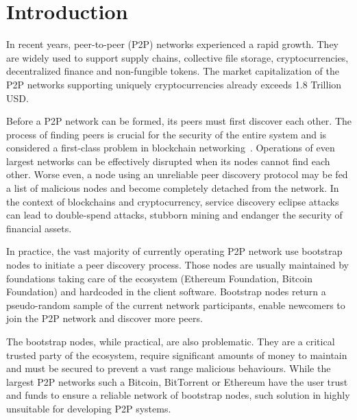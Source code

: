 
\section{Introduction}
In recent years, peer-to-peer (P2P) networks experienced a rapid growth. They are widely used to support supply chains, collective file storage, cryptocurrencies, decentralized finance and non-fungible tokens. The market capitalization of the P2P networks supporting uniquely cryptocurrencies already exceeds 1.8 Trillion USD. 



Before a P2P network can be formed, its peers must first discover each other. The process of finding peers is crucial for the security of the entire system and is considered a first-class problem in blockchain networking~\cite{dotan2021survey}. Operations of even largest networks can be effectively disrupted when its nodes cannot find each other. Worse even, a node using an unreliable peer discovery protocol may be fed a list of malicious nodes and become completely detached from the network. In the context of blockchains and cryptocurrency, service discovery eclipse attacks can lead to double-spend attacks, stubborn mining and endanger the security of financial assets.

In practice, the vast majority of currently operating P2P network use bootstrap nodes to initiate a peer discovery process. Those nodes are usually maintained by foundations taking care of the ecosystem (\eg Ethereum Foundation, Bitcoin Foundation) and hardcoded in the client software. Bootstrap nodes return a pseudo-random sample of the current network participants, enable newcomers to join the P2P network and discover more peers. 

The bootstrap nodes, while practical, are also problematic. They are a critical trusted party of the ecosystem, require significant amounts of money to maintain and must be secured to prevent a vast range malicious behaviours. While the largest P2P networks such a Bitcoin, BitTorrent or Ethereum have the user trust and funds to ensure a reliable network of bootstrap nodes, such solution in highly unsuitable for developing P2P systems.


